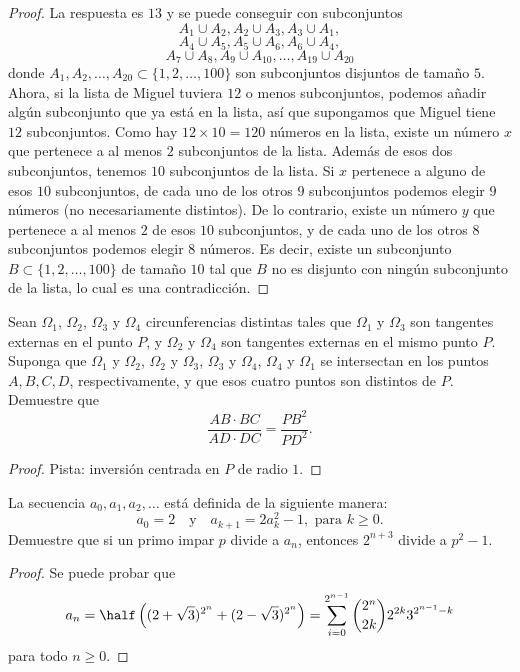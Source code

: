\begin{proof}
	La respuesta es $13$ y se puede conseguir con subconjuntos
	\[A_1\cup A_2,A_2\cup A_3,A_3\cup A_1,\]
	\[A_4\cup A_5,A_5\cup A_6,A_6\cup A_4,\]
	\[A_7\cup A_8,A_9\cup A_{10},\dots,A_{19}\cup A_{20}\]
	donde $A_1,A_2,\dots,A_{20}\subset\{1,2,\dots,100\}$ son subconjuntos disjuntos de tamaño $5$. Ahora, si la lista de Miguel tuviera $12$ o menos subconjuntos, podemos añadir algún subconjunto que ya está en la lista, así que supongamos que Miguel tiene $12$ subconjuntos. Como hay $12\times 10=120$ números en la lista, existe un número $x$ que pertenece a al menos $2$ subconjuntos de la lista. Además de esos dos subconjuntos, tenemos $10$ subconjuntos de la lista. Si $x$ pertenece a alguno de esos $10$ subconjuntos, de cada uno de los otros $9$ subconjuntos podemos elegir $9$ números (no necesariamente distintos). De lo contrario, existe un número $y$ que pertenece a al menos $2$ de esos $10$ subconjuntos, y de cada uno de los otros $8$ subconjuntos podemos elegir $8$ números. Es decir, existe un subconjunto $B\subset\{1,2,\dots,100\}$ de tamaño $10$ tal que $B$ no es disjunto con ningún subconjunto de la lista, lo cual es una contradicción.
\end{proof}

\begin{probEG}
	Sean $\Omega_1$, $\Omega_2$, $\Omega_3$ y $\Omega_4$ circunferencias distintas tales que $\Omega_1$ y $\Omega_3$ son tangentes externas en el punto $P$, y $\Omega_2$ y $\Omega_4$ son tangentes externas en el mismo punto $P$. Suponga que $\Omega_1$ y $\Omega_2$, $\Omega_2$ y $\Omega_3$, $\Omega_3$ y $\Omega_4$, $\Omega_4$ y $\Omega_1$ se intersectan en los puntos $A,B,C,D$, respectivamente, y que esos cuatro puntos son distintos de $P$. Demuestre que
	\[\frac{AB\cdot BC}{AD\cdot DC}=\frac{PB^2}{PD^2}.\]
\end{probEG}

\begin{proof}
	Pista: inversión centrada en $P$ de radio $1$.
\end{proof}

\begin{probMR}
	La secuencia $a_0,a_1,a_2,\dots$ está definida de la siguiente manera:
	\[a_0=2\quad\text{y}\quad a_{k+1}=2a_k^2-1,\text{ para }k\ge 0.\]
	Demuestre que si un primo impar $p$ divide a $a_n$, entonces $2^{n+3}$ divide a $p^2-1$.
\end{probMR}

\begin{proof}
	Se puede probar que
	\[a_n=\half\left((2+\sqrt{3})^{2^n}+(2-\sqrt{3})^{2^n}\right)=\sum_{i=0}^{2^{n-1}}\binom{2^n}{2k}2^{2k}3^{2^{n-1}-k}\]
	para todo $n\ge 0$.
\end{proof}
